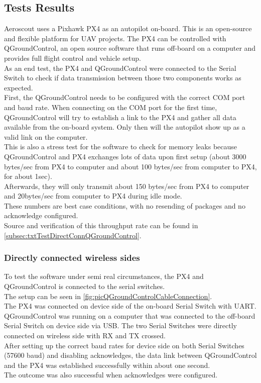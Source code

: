 \subsection{Tests Results} \label{subsec:txtTestResults}
Aeroscout uses a Pixhawk PX4 as an autopilot on-board. This is an open-source and flexible platform for UAV projects. The PX4 can be controlled with QGroundControl, an open source software that runs off-board on a computer and provides full flight control and vehicle setup.\\
As an end test, the PX4 and QGroundControl were connected to the Serial Switch to check if data transmission between those two components works as expected.\\
First, the QGroundControl needs to be configured with the correct COM port and baud rate. When connecting on the COM port for the first time, QGroundControl will try to establish a link to the PX4 and gather all data available from the on-board system. Only then will the autopilot show up as a valid link on the computer.\\
This is also a stress test for the software to check for memory leaks because QGroundControl and PX4 exchanges lots of data upon first setup (about 3000 bytes/sec from PX4 to computer and about 100 bytes/sec from computer to PX4, for about 1sec). \\ 
Afterwards, they will only transmit about 150 bytes/sec from PX4 to computer and 20bytes/sec from computer to PX4 during idle mode.\\
These numbers are best case conditions, with no resending of packages and no acknowledge configured.\\
Source and verification of this throughput rate can be found in \autoref{subsec:txtTestDirectConnQGroundControl}.
%
\subsubsection{Directly connected wireless sides}
%
To test the software under semi real circumstances, the PX4 and QGroundControl is connected to the serial switches.\\
The setup can be seen in \autoref{fig:picQGroundControlCableConnection}.\\
The PX4 was connected on device side of the on-board Serial Switch with UART. QGroundControl was running on a computer that was connected to the off-board Serial Switch on device side via USB. The two Serial Switches were directly connected on wireless side with RX and TX crossed. \\
After setting up the correct baud rates for device side on both Serial Switches (57600 baud) and disabling acknowledges, the data link between QGroundControl and the PX4 was established successfully within about one second.\\
The outcome was also successful when acknowledges were configured.\\
%
